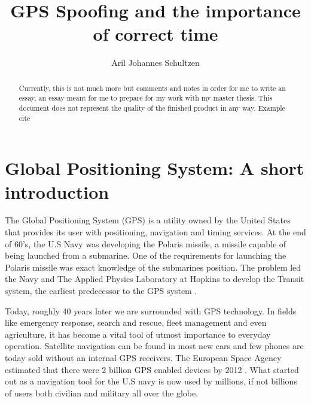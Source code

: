 \documentclass[12pt,english,a4paper]{article}
\title{GPS Spoofing and the importance of correct time}
\author{Aril Johannes Schultzen}
\begin{document}
\maketitle
\thispagestyle{empty}
\setcounter{page}{0}
\newpage
\tableofcontents
\thispagestyle{empty}
\setcounter{page}{0}
\newpage
\thispagestyle{empty}
\setcounter{page}{0}

\begin{abstract}
Currently, this is not much more but comments and notes in order for me to write an essay, an essay meant for me to prepare for my work with my master thesis. This document does not represent the quality of the finished product in any way. Example cite \cite{KandR}
\end{abstract}

\newpage
\clearpage
\setcounter{page}{1}

\section{Global Positioning System: A short introduction}
The Global Positioning System (GPS) is a utility owned by the United States that provides its user with positioning, navigation and timing services. At the end of 60's, the U.S Navy was developing the Polaris missile, a missile capable of being launched from a submarine. One of the requirements for launching the Polaris missile was exact knowledge of the submarines position. The problem led the Navy and The Applied Physics Laboratory at Hopkins to develop the Transit system, the earliest predecessor to the GPS system \cite{SteJ}. 

Today, roughly 40 years later we are surrounded with GPS technology. In fields like emergency response, search and rescue, fleet management and even agriculture, it has become a vital tool of utmost importance to everyday operation. Satellite navigation can be found in most new cars and few phones are today sold without an internal GPS receivers. The European Space Agency estimated that there were 2 billion GPS enabled devices by 2012 \cite{ESA}. What started out as a navigation tool for the U.S navy is now used by millions, if not billions of users both civilian and military all over the globe.
\end{document}
